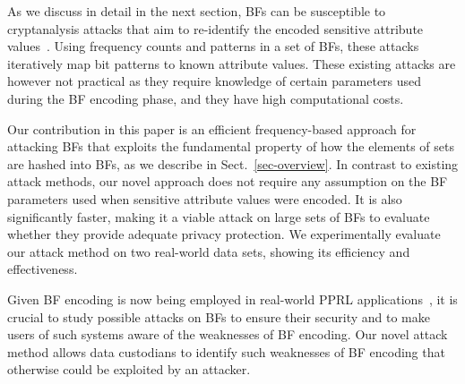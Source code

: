 \documentclass{llncs}
\begin{document}

As we discuss in detail in the next section, BFs can be susceptible
to cryptanalysis attacks that aim to re-identify the encoded
sensitive attribute values~\cite{Kro15,Kuz11,Kuz13,Nie14}. Using 
frequency counts and patterns in a set of BFs, these attacks
iteratively map bit patterns to known attribute values. These existing
attacks are however not practical as they require knowledge of certain
parameters used during the BF encoding phase, and they have high
computational costs.

Our contribution in this paper is an efficient frequency-based
approach for attacking BFs that exploits the fundamental property of
how the elements of sets are hashed into BFs, as we describe in
Sect.~\ref{sec-overview}. In contrast to existing attack methods, our
novel approach does not require any assumption on the BF parameters
used when sensitive attribute values were encoded. It is also
significantly faster, making it a viable attack on large sets of
BFs to evaluate whether they provide adequate privacy protection. We
experimentally evaluate our attack method on two real-world data
sets, showing its efficiency and effectiveness.

Given BF encoding is now being employed in real-world PPRL
applications~\cite{Boy15,Ran14}, it is crucial to study possible
attacks on BFs to ensure their security and to make users of such
systems aware of the weaknesses of BF encoding. Our novel attack
method allows data custodians to identify such weaknesses of BF
encoding that otherwise could be exploited by an attacker.

\end{document}
